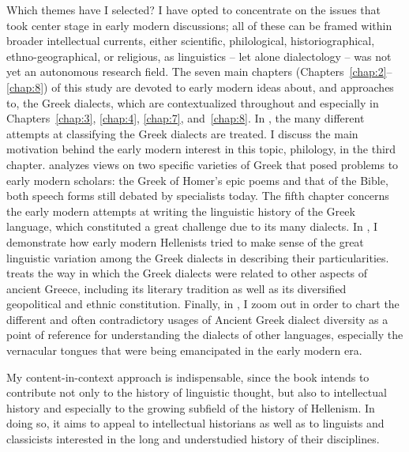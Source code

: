 Which themes have I selected? I have opted to concentrate on the issues that took center stage in early modern discussions; all of these can be framed within broader intellectual currents, either scientific, philological, historiographical, eth\-no-geographical, or religious, as linguistics – let alone dialectology – was not yet an autonomous research field. The seven main chapters (Chapters~\ref{chap:2}–\ref{chap:8}) of this study are devoted to early modern ideas about, and approaches to, the Greek dialects, which are contextualized throughout and especially in Chapters~\ref{chap:3}, \ref{chap:4}, \ref{chap:7}, and~\ref{chap:8}. In , the many different attempts at classifying the Greek dialects are treated. I discuss the main motivation behind the early modern interest in this topic, philology, in the third chapter.  analyzes views on two specific varieties of Greek that posed problems to early modern scholars: the Greek of Homer’s epic poems and that of the Bible, both speech forms still debated by specialists today. The fifth chapter concerns the early modern attempts at writing the linguistic history of the Greek language, which constituted a great challenge due to its many dialects. In , I demonstrate how early modern Hellenists tried to make sense of the great linguistic variation among the Greek dialects in describing their particularities.  treats the way in which the Greek dialects were related to other aspects of ancient Greece, including its literary tradition as well as its diversified geopolitical and ethnic constitution. Finally, in , I zoom out in order to chart the different and often contradictory usages of Ancient Greek dialect diversity as a point of reference for understanding the dialects of other languages, especially the vernacular tongues that were being emancipated in the early modern era.

My content-in-context approach is indispensable, since the book intends to contribute not only to the history of linguistic thought, but also to intellectual history and especially to the growing subfield of the history of Hellenism. In doing so, it aims to appeal to intellectual historians as well as to linguists and classicists interested in the long and understudied history of their disciplines.
